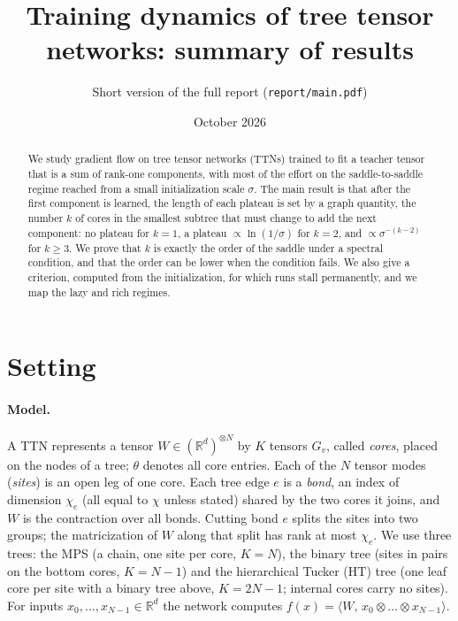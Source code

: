 \documentclass[11pt]{article}
\title{Training dynamics of tree tensor networks: summary of results}
\author{Short version of the full report (\texttt{report/main.pdf})}
\date{October 2026}
\begin{document}
\maketitle
\vspace{-1.2em}

\begin{abstract}
We study gradient flow on tree tensor networks (TTNs) trained to fit a teacher tensor that is a sum of
rank-one components, with most of the effort on the saddle-to-saddle regime reached from a small
initialization scale $\sigma$. The main result is that
after the first component is learned, the length of each plateau is set by a graph quantity, the number $k$
of cores in the smallest subtree that must change to add the next component: no plateau for $k=1$, a
plateau $\propto\ln(1/\sigma)$ for $k=2$, and $\propto\sigma^{-(k-2)}$ for $k\ge3$. We prove that $k$ is
exactly the order of the saddle under a spectral condition, and that the order can be lower when the
condition fails. We also give a criterion, computed from the initialization, for which runs stall
permanently, and we map the lazy and rich regimes.
\end{abstract}

\section{Setting}

\paragraph{Model.} A TTN represents a tensor $W\in(\mathbb R^d)^{\otimes N}$ by $K$ tensors $G_v$, called
\emph{cores}, placed on the nodes of a tree; $\theta$ denotes all core entries. Each of the $N$ tensor modes
(\emph{sites}) is an open leg of one core. Each tree edge $e$ is a \emph{bond}, an index of dimension $\chi_e$
(all equal to $\chi$ unless stated) shared by the two cores it joins, and $W$ is the contraction over all
bonds. Cutting bond $e$ splits the sites into two groups; the matricization of $W$ along that split has rank at
most $\chi_e$. We use three trees: the MPS (a chain, one site per core, $K=N$), the binary tree (sites in pairs on
the bottom cores, $K=N-1$) and the hierarchical Tucker (HT) tree (one leaf core per site with a binary tree
above, $K=2N-1$; internal cores carry no sites). For inputs $x_0,\dots,x_{N-1}\in\mathbb R^d$ the network computes
$f(x)=\langle W,\,x_0\otimes\dots\otimes x_{N-1}\rangle$.
\end{document}
